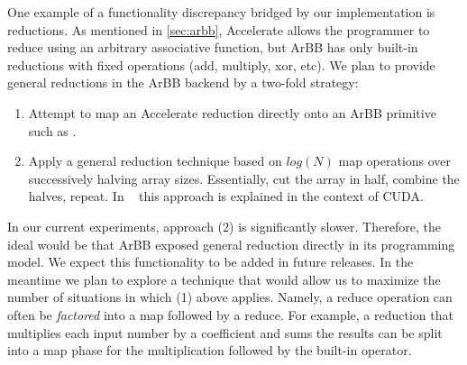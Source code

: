 %

One example of a functionality discrepancy bridged by our
implementation is reductions.  As mentioned in \ref{sec:arbb},
Accelerate allows the programmer to reduce using an arbitrary
associative function, but ArBB has only built-in reductions with fixed
operations (add, multiply, xor, etc). We plan to provide general reductions in
the ArBB backend by a two-fold strategy:

\begin{enumerate}
\item Attempt to map an Accelerate reduction directly onto an ArBB
  primitive such as .
\item Apply a general reduction technique based on $log(N)$ map
  operations over successively halving array sizes.  Essentially, cut
  the array in half, combine the halves, repeat. In ~\cite{reduction}
  this approach is explained in the context of CUDA. 
\end{enumerate}


In our current experiments, approach (2) is significantly slower.
Therefore, the ideal would be that ArBB exposed general reduction
directly in its programming model.  We expect this functionality to be
added in future releases.  In the meantime we plan to explore a
technique that would allow us to maximize the number of situations in
which (1) above applies.  Namely, a reduce operation can often be {\em
  factored} into a map followed by a reduce.  For example, a reduction
that multiplies each input number by a coefficient and sums the
results can be split into a map phase for the multiplication followed
by the built-in  operator.

